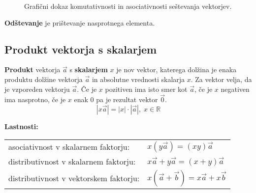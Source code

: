 \documentclass[a4paper,oneside,12pt,fleqn]{article}
\def\R{\ensuremath{\mathbb R}}
\newcommand\krat\cdot
\newcommand{\beforecaptionskip}{\vspace{-12pt}}
\numberwithin{equation}{section}
\begin{document}
\begin{figure}[ht]
   \begin{center}
  \end{center}
  \beforecaptionskip
  \caption{Grafični dokaz komutativnosti in asociativnosti seštevanja vektorjev.}
  \label{fig:vec:sest:zak}
\end{figure}

\textbf{Odštevanje} je prištevanje nasprotnega elementa.

\subsection{Produkt vektorja s skalarjem}
\label{sec:vec:vecskal}
\textbf{Produkt} vektorja $\vec{a}$ s \textbf{skalarjem} $x$ je nov vektor, katerega dolžina je enaka
produktu dolžine vektorja $\vec{a}$ in absolutne vrednosti skalarja $x$. Za vektor velja,
da je vzporeden vektorju $\vec{a}$. Če je $x$ pozitiven ima isto smer kot $\vec{a}$, če je
$x$ negativen ima nasprotno, če je $x$ enak 0 pa je rezultat vektor $\vec{0}$.
\[ \left| x\vec{a} \right| = \left| x \right| \krat \left| \vec{a} \right|, \; x \in \R \]

\textbf{Lastnosti:}\\[6pt]
\begin{tabular}[h!]{ll}
  asociativnost v skalarnem faktorju:    & $x(y\vec{a}) = (xy)\vec{a}$ \\
  distributivnost v skalarnem faktorju:  & $x\vec{a} + y\vec{a} = (x+y)\vec{a}$ \\
  distributivnost v vektorskem faktorju: & $x(\vec{a} + \vec{b}) = x\vec{a} + x\vec{b}$
\end{tabular}
\end{document}
